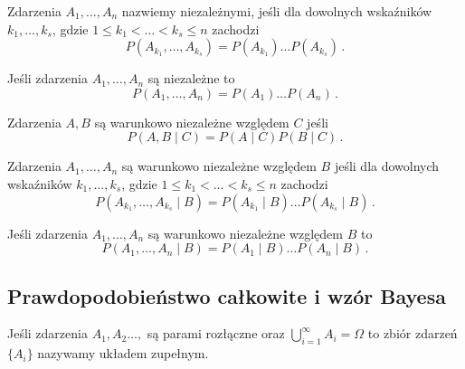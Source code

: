 \documentclass{myclass}
\numberwithin{equation}{subsection}
\begin{document}
\begin{definition}
Zdarzenia \(A_1,\ldots,A_n\) nazwiemy niezależnymi, jeśli dla dowolnych wskaźników
\(k_1,\ldots,k_s\), gdzie \(1 \leq k_1 < \ldots < k_s \leq n\) zachodzi
\begin{equation*}
    P(A_{k_1},\ldots,A_{k_s}) = P(A_{k_1}) \ldots P(A_{k_s})\,.
\end{equation*}
\end{definition}

\begin{theorem}
Jeśli zdarzenia \(A_1,\ldots,A_n\) są niezależne to
\begin{equation*}
    P(A_1,\ldots,A_n) = P(A_1) \ldots P(A_n)\,.
\end{equation*}
\end{theorem}

\begin{definition}
Zdarzenia \(A,B\) są warunkowo niezależne względem \(C\) jeśli
\begin{equation*}
    P(A,B \mid C) = P(A \mid C) P(B \mid C)\,.
\end{equation*}
\end{definition}

\begin{definition}
Zdarzenia \(A_1,\ldots,A_n\) są warunkowo niezależne względem \(B\) jeśli dla dowolnych wskaźników
\(k_1,\ldots,k_s\), gdzie \(1 \leq k_1 < \ldots < k_s \leq n\) zachodzi
\begin{equation*}
    P(A_{k_1},\ldots,A_{k_s} \mid B) = P(A_{k_1} \mid B) \ldots P(A_{k_s} \mid B)\,.
\end{equation*}
\end{definition}

\begin{theorem}
Jeśli zdarzenia \(A_1,\ldots,A_n\) są warunkowo niezależne względem \(B\) to
\begin{equation*}
    P(A_1,\ldots,A_n \mid B) = P(A_1 \mid B) \ldots P(A_n \mid B)\,.
\end{equation*}
\end{theorem}


\subsection{Prawdopodobieństwo całkowite i wzór Bayesa}

\begin{definition}
Jeśli zdarzenia \(A_1,A_2\ldots,\) są parami rozłączne oraz \(\bigcup_{i=1}^\infty A_i = \Omega\) to
zbiór zdarzeń \(\{A_i\}\) nazywamy układem zupełnym.
    
\end{definition}
\end{document}

